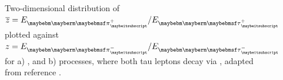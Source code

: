 \begin{figure}[htbp]
\begin{subfigure}[t]{0.45\textwidth}
    \caption{\HiggsToTauTau}
    \label{fig:theoryTauPairCorrelationH}
  \end{subfigure}
\caption[Two-dimensional distribution of \ZToTauTau and \HiggsToTauTau.]
{Two-dimensional distribution of $\overline{z} ={E_{\Ppiplus}}/{E_{\APtauon}}$ plotted against $ z ={E_{\Ppiminus}}/{E_{\Ptauon}}$  for a) \ZToTauTau, and b) \HiggsToTauTau processes, where both tau leptons decay via \tauToPion, adapted from reference \cite{Tsai:1971vv}.}
\label{fig:theoryTauPairCorrelation}
\end{figure} 